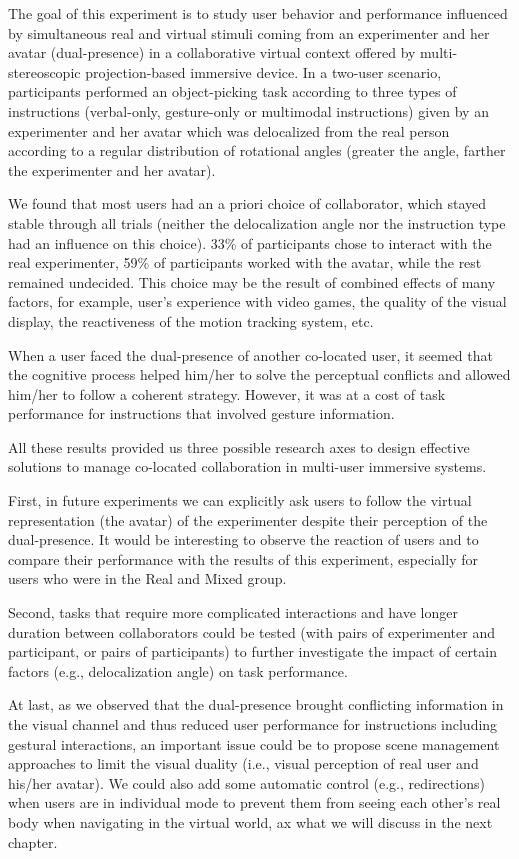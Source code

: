 The goal of this experiment is to study user behavior and performance influenced by simultaneous real and virtual stimuli coming from an experimenter and her avatar (dual-presence) in a collaborative virtual context offered by multi-stereoscopic projection-based immersive device. In a two-user scenario, participants performed an object-picking task according to three types of instructions (verbal-only, gesture-only or multimodal instructions) given by an experimenter and her avatar which was delocalized from the real person according to a regular distribution of rotational angles (greater the angle, farther the experimenter and her avatar).

We found that most users had an a priori choice of collaborator, which stayed stable through all trials (neither the delocalization angle nor the instruction type had an influence on this choice). 33\% of participants chose to interact with the real experimenter, 59\% of participants worked with the avatar, while the rest remained undecided. This choice may be the result of combined effects of many factors, for example, user's experience with video games, the quality of the visual display, the reactiveness of the motion tracking system, etc.

When a user faced the dual-presence of another co-located user, it seemed that the cognitive process helped him/her to solve the perceptual conflicts and allowed him/her to follow a coherent strategy. However, it was at a cost of task performance for instructions that involved gesture information.

All these results provided us three possible research axes to design effective solutions to manage co-located collaboration in multi-user immersive systems.

First, in future experiments we can explicitly ask users to follow the virtual representation (the avatar) of the experimenter despite their perception of the dual-presence. It would be interesting to observe the reaction of users and to compare their performance with the results of this experiment, especially for users who were in the Real and Mixed group.

Second, tasks that require more complicated interactions and have longer duration between collaborators could be tested (with pairs of experimenter and participant, or pairs of participants) to further investigate the impact of certain factors (e.g., delocalization angle) on task performance.

At last, as we observed that the dual-presence brought conflicting information in the visual channel and thus reduced user performance for instructions including gestural interactions, an important issue could be to propose scene management approaches to limit the visual duality (i.e., visual perception of real user and his/her avatar). We could also add some automatic control (e.g., redirections) when users are in individual mode to prevent them from seeing each other's real body when navigating in the virtual world, ax what we will discuss in the next chapter.